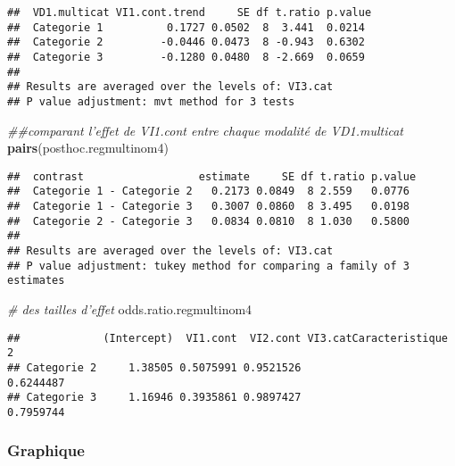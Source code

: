 \documentclass[
]{book}
\newenvironment{Shaded}{\begin{snugshade}}{\end{snugshade}}
\newcommand{\CommentTok}[1]{\textcolor[rgb]{0.56,0.35,0.01}{\textit{#1}}}
\newcommand{\KeywordTok}[1]{\textcolor[rgb]{0.13,0.29,0.53}{\textbf{#1}}}
\newcommand{\NormalTok}[1]{#1}
\begin{document}
\begin{verbatim}
##  VD1.multicat VI1.cont.trend     SE df t.ratio p.value
##  Categorie 1          0.1727 0.0502  8  3.441  0.0214 
##  Categorie 2         -0.0446 0.0473  8 -0.943  0.6302 
##  Categorie 3         -0.1280 0.0480  8 -2.669  0.0659 
## 
## Results are averaged over the levels of: VI3.cat 
## P value adjustment: mvt method for 3 tests
\end{verbatim}

\begin{Shaded}
\begin{Highlighting}[]
\CommentTok{##comparant l'effet de VI1.cont entre chaque modalité de VD1.multicat}
\KeywordTok{pairs}\NormalTok{(posthoc.regmultinom4)}
\end{Highlighting}
\end{Shaded}

\begin{verbatim}
##  contrast                  estimate     SE df t.ratio p.value
##  Categorie 1 - Categorie 2   0.2173 0.0849  8 2.559   0.0776 
##  Categorie 1 - Categorie 3   0.3007 0.0860  8 3.495   0.0198 
##  Categorie 2 - Categorie 3   0.0834 0.0810  8 1.030   0.5800 
## 
## Results are averaged over the levels of: VI3.cat 
## P value adjustment: tukey method for comparing a family of 3 estimates
\end{verbatim}

\begin{Shaded}
\begin{Highlighting}[]
\CommentTok{# des tailles d'effet}
\NormalTok{odds.ratio.regmultinom4}
\end{Highlighting}
\end{Shaded}

\begin{verbatim}
##             (Intercept)  VI1.cont  VI2.cont VI3.catCaracteristique 2
## Categorie 2     1.38505 0.5075991 0.9521526                0.6244487
## Categorie 3     1.16946 0.3935861 0.9897427                0.7959744
\end{verbatim}

\hypertarget{graphique-16}{%
\subsubsection{Graphique}\label{graphique-16}}
\end{document}
